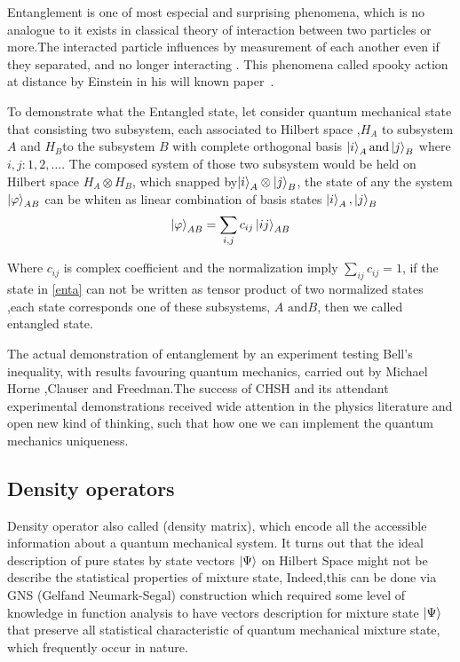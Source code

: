 
Entanglement is one of most especial and surprising phenomena, which is no analogue to it exists in classical theory of interaction between two particles or more\citep{PhysRevLett.78.5022}.The interacted particle influences by measurement of each another even if they separated, and no longer interacting . This phenomena called spooky action at distance by Einstein in his will known paper~\cite{EPR}.

To demonstrate what the Entangled state, let consider quantum mechanical state that consisting two subsystem, each associated to Hilbert space ,$H_A$ to subsystem $A$ and $H_B$to the subsystem $B$ with complete orthogonal basis $\ket{i}_A \text{and} \ket{j}_B$ where $i,j:1,2,\dots$. 
The composed system of those two subsystem would be held on Hilbert space $H_A\otimes H_B$, which snapped by$\ket{i}_A \otimes \ket{j}_B$, the state of any the system $\ket{\varphi}_{AB}$ can be whiten as linear combination of basis states $\ket{i}_A ,\ket{j}_B$
\begin{equation}\label{enta}
\ket{\varphi}_{AB}=\sum_{i,j} c_{ij} \ket{ij}_{AB}
\end{equation}

Where $c_{ij}$ is complex coefficient and the normalization imply $\sum_{ij} c_{ij}=1$, if the state in \ref{enta} can not be written as tensor product of two normalized states ,each state corresponds  one of these subsystems, $A\text{ and} B$, then we called entangled state.

The actual demonstration of entanglement by an experiment testing Bell’s inequality, with results favouring quantum mechanics, carried out by Michael Horne ,Clauser and Freedman\citep{PhysRevLett.23.880}.The success of CHSH and its attendant experimental demonstrations received wide attention in the physics literature and open new kind of thinking, such that how one we can implement the quantum mechanics uniqueness.


\subsection{Density operators}\label{DMO}



Density operator also called (density matrix), which encode all the accessible information about a quantum mechanical system. It turns out that the ideal description of pure states by state vectors $\ket{\Psi}$ on Hilbert Space might not be describe the statistical properties of mixture state, Indeed,this can be done via GNS (Gelfand Neumark-Segal) construction \citep{book:72351}which required some level of knowledge in function analysis to have vectors description for mixture state $\ket{\Psi}$ that preserve all statistical characteristic of quantum mechanical mixture state, which frequently occur in nature.


